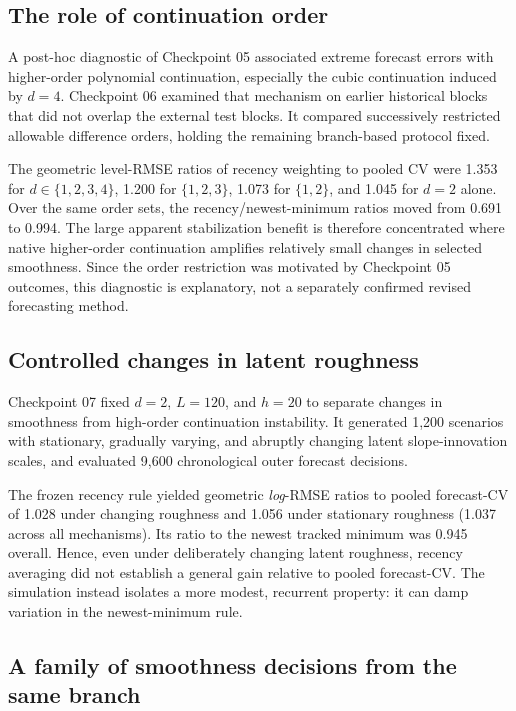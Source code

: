 \subsection{The role of continuation order}

A post-hoc diagnostic of Checkpoint 05 associated extreme forecast errors
with higher-order polynomial continuation, especially the cubic
continuation induced by $d=4$. Checkpoint 06 examined that mechanism on
earlier historical blocks that did not overlap the external test blocks.
It compared successively restricted allowable difference orders,
holding the remaining branch-based protocol fixed.

The geometric level-RMSE ratios of recency weighting to pooled CV were
1.353 for $d\in\{1,2,3,4\}$, 1.200 for $\{1,2,3\}$, 1.073 for
$\{1,2\}$, and 1.045 for $d=2$ alone. Over the same order sets, the
recency/newest-minimum ratios moved from 0.691 to 0.994. The
large apparent stabilization benefit is therefore concentrated where
native higher-order continuation amplifies relatively small changes in
selected smoothness. Since the order restriction was motivated by
Checkpoint 05 outcomes, this diagnostic is explanatory, not a separately
confirmed revised forecasting method.

\subsection{Controlled changes in latent roughness}

Checkpoint 07 fixed $d=2$, $L=120$, and $h=20$ to separate changes in
smoothness from high-order continuation instability. It generated 1,200
scenarios with stationary, gradually varying, and abruptly changing
latent slope-innovation scales, and evaluated 9,600 chronological outer
forecast decisions.

The frozen recency rule yielded geometric \emph{log}-RMSE ratios to pooled
forecast-CV of 1.028 under changing roughness and 1.056 under stationary
roughness (1.037 across all mechanisms). Its ratio to the newest tracked
minimum was 0.945 overall. Hence, even under deliberately changing latent
roughness, recency averaging did not establish a general gain relative to
pooled forecast-CV. The simulation instead isolates a more modest, recurrent
property: it can damp variation in the newest-minimum rule.

\subsection{A family of smoothness decisions from the same branch}

